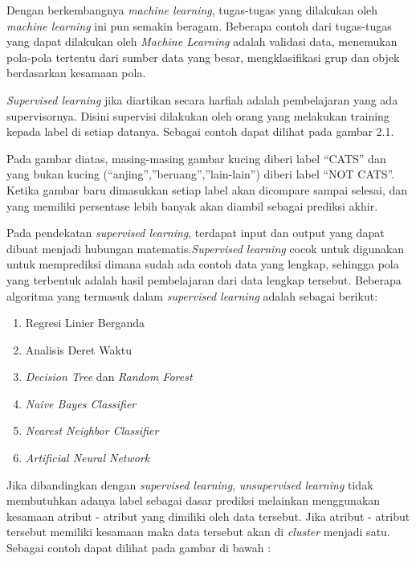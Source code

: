 \par Dengan berkembangnya \textit{machine learning}, tugas-tugas yang dilakukan oleh \textit{machine learning} ini pun semakin beragam. Beberapa contoh dari tugas-tugas yang dapat dilakukan oleh \textit{Machine Learning} adalah validasi data, menemukan pola-pola tertentu dari sumber data yang besar, mengklasifikasi grup dan objek berdasarkan kesamaan pola.

\vspace{1ex}
\par \textit{Supervised learning} jika diartikan secara harfiah adalah pembelajaran yang ada supervisornya. Disini supervisi dilakukan oleh orang yang melakukan training kepada label di setiap datanya. Sebagai contoh dapat dilihat pada gambar 2.1. 
\vspace{1ex}

\par Pada gambar diatas, masing-masing gambar kucing diberi label “CATS” dan yang bukan kucing (“anjing”,”beruang”,”lain-lain”) diberi label “NOT CATS”. Ketika gambar baru dimasukkan setiap label akan dicompare sampai selesai, dan yang memiliki persentase lebih banyak akan diambil sebagai prediksi akhir.

\vspace{1ex}

\par Pada pendekatan \textit{supervised learning}, terdapat input dan output yang dapat dibuat menjadi hubungan matematis.\textit{Supervised learning} cocok untuk digunakan untuk memprediksi dimana sudah ada contoh data yang lengkap, sehingga pola yang terbentuk adalah hasil pembelajaran dari data lengkap tersebut. Beberapa algoritma yang termasuk dalam \textit{supervised learning} adalah sebagai berikut:
\begin{enumerate}
	\vspace{-2mm}
	\item Regresi Linier Berganda
	\vspace{-2mm}
	\item Analisis Deret Waktu
	\vspace{-2mm}
	\item \textit{Decision Tree} dan \textit{Random Forest}
	\vspace{-2mm}
	\item \textit{Naive Bayes Classifier}
	\vspace{-2mm}
	\item \textit{Nearest Neighbor Classifier}
	\vspace{-2mm}
	\item \textit{Artificial Neural Network}
	\vspace{-1mm}
\end{enumerate}
\par Jika dibandingkan dengan \textit{supervised learning}, \textit{unsupervised learning} tidak membutuhkan adanya label sebagai dasar prediksi melainkan menggunakan kesamaan atribut - atribut yang dimiliki oleh data tersebut. Jika atribut - atribut tersebut memiliki kesamaan maka data tersebut akan di \textit{cluster} menjadi satu. Sebagai contoh dapat dilihat pada gambar di bawah :

